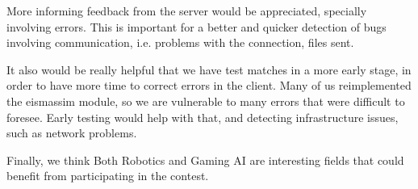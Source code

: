 \documentclass{llncs2e/llncs}
\begin{document}
    More informing feedback from the server would be appreciated, specially
    involving errors. This is important for a better and quicker detection of bugs
    involving communication, i.e. problems with the connection, files sent.

    It also would be really helpful that we have test matches 
    in a more early stage, in order to have more time to correct errors in the 
    client. Many of us reimplemented the eismassim module, so we are vulnerable to 
    many errors that were difficult to foresee. Early testing would help with 
    that, and detecting infrastructure issues, such as network problems.
    
    Finally, we think Both Robotics and Gaming AI are interesting fields that could 
    benefit from participating in the contest.

    
 
 


\end{document}

